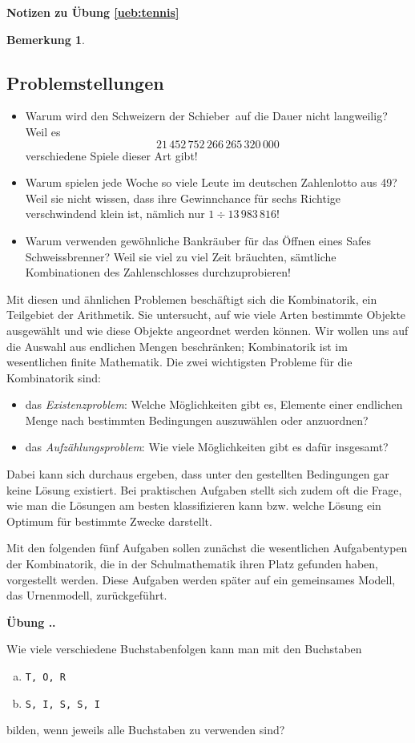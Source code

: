 \documentclass[%
<<<<<<< Updated upstream
11pt,%
twoside,%
titlepage,%
german,%
=======
11pt,%
twoside,%
titlepage,%
swissgerman,%
>>>>>>> Stashed changes
headsepline%
]{scrartcl}
\newcommand{\faEyeLightGray}{\textcolor{lightgray}{\faEye}} %
\newcommand{\faReturnGray}{\textcolor{gray}{\faMailReply}} %
\newcommand{\faEyeLightGray}{\textcolor{lightgray}{\faEye}} %
\newcommand{\definition}[1]{\colorbox{emerald}{#1}}
\theoremstyle{definition}
\newtheorem{bem}{Bemerkung}[subsection] %
\theoremstyle{plain}
\newcommand{\concatueb}[1]{ueb:#1}%
\newcommand{\concatlsg}[1]{lsg:#1}%
\newcounter{uebcounter}[section]
\renewcommand{\theuebcounter}{\thesection.\arabic{uebcounter}}  %
\newenvironment{lsg}[1]{%
    \par\noindent\textbf{Notizen zu Übung \ref{\concatueb{#1}}}\label{\concatlsg{#1}}
    \hfill\hyperref[\concatueb{#1}]{\faReturnGray}\par %
}{%
    \par%
}
\newenvironment{uebenv}[1]{%
    \refstepcounter{uebcounter}
    \par\noindent\textbf{Übung \theuebcounter.}%
    \label{\concatueb{#1}}\hfill\hyperref[\concatlsg{#1}]{\faEyeLightGray}\par
}{%
    \par
}
\newcounter{theo}[section]\setcounter{theo}{0}
\newcommand{\concatueb}[1]{ueb:#1}%
\newcommand{\concatlsg}[1]{lsg:#1}%
\newcounter{uebcounter}[section]
\renewcommand{\theuebcounter}{\thesection.\arabic{uebcounter}}  %
\newenvironment{lsg}[1]{%
    \par\noindent\textbf{Notizen zu Übung \ref{\concatueb{#1}}.}%
    \label{\concatlsg{#1}}
}{%
    \par%
}
\newenvironment{uebenv}[1]{%
    \refstepcounter{uebcounter}
    \par\noindent\textbf{Übung \theuebcounter.}%
    \label{\concatueb{#1}}\hfill\hyperref[\concatlsg{#1}]{\faEyeLightGray}\newline
}{%
    \par
}
\newcommand{\definition}[1]{\colorbox{emerald}{#1}}
\begin{document}
\begin{lsg}{tennis}
\begin{bem}
\subsection{Problemstellungen}
\begin{itemize}
\item Warum wird den Schweizern der \glqq Schieber\grqq\ auf die Dauer nicht langweilig? Weil es
$$21\,452\,752\,266\,265\,320\,000$$
verschiedene Spiele dieser Art gibt!
\item Warum spielen jede Woche so viele Leute im deutschen Zahlenlotto  aus 49\grqq?
Weil sie nicht wissen, dass ihre Gewinnchance für sechs Richtige verschwindend klein ist, nämlich nur $1\div13\,983\,816$!
\item Warum verwenden gewöhnliche Bankräuber für das Öffnen eines Safes Schweissbrenner?
Weil sie viel zu viel Zeit bräuchten, sämtliche Kombinationen des Zahlenschlosses durchzuprobieren!
\end{itemize}

Mit diesen und ähnlichen Problemen beschäftigt sich die \definition{Kombinatorik}, ein Teilgebiet der Arithmetik. Sie untersucht, auf wie viele Arten bestimmte Objekte ausgewählt und wie diese Objekte angeordnet werden können. Wir wollen uns auf die Auswahl aus endlichen Mengen beschränken; Kombinatorik ist im wesentlichen finite Mathematik. Die zwei wichtigsten Probleme für die Kombinatorik sind:
\begin{itemize}
\item das \emph{Existenzproblem}: Welche Möglichkeiten gibt es, Elemente einer endlichen Menge nach bestimmten Bedingungen auszuwählen oder anzuordnen?
\item das \emph{Aufzählungsproblem}: Wie viele Möglichkeiten gibt es dafür insgesamt?
\end{itemize}

Dabei kann sich durchaus ergeben, dass unter den gestellten Bedingungen gar keine Lösung existiert. Bei praktischen Aufgaben stellt sich zudem oft die Frage, wie man die Lösungen am besten klassifizieren kann bzw. welche Lösung ein Optimum für bestimmte Zwecke darstellt.

Mit den folgenden fünf Aufgaben sollen zunächst die wesentlichen Aufgabentypen der Kombinatorik, die in der Schulmathematik ihren Platz gefunden haben, vorgestellt werden. Diese Aufgaben werden später auf ein gemeinsames Modell, das Urnenmodell, zurückgeführt.

\begin{uebenv}{torundsissi}
Wie viele verschiedene Buchstabenfolgen kann man mit den Buchstaben
\begin{enumerate}[a)]
\item \texttt{T, O, R}
\item \texttt{S, I, S, S, I}
\end{enumerate}
bilden, wenn jeweils alle Buchstaben zu verwenden sind?
\end{uebenv}




\end{bem}
\end{lsg}
\end{document}
